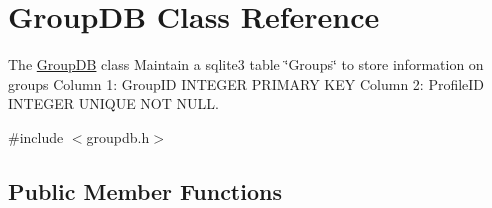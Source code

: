 \hypertarget{classGroupDB}{}\section{Group\+DB Class Reference}
\label{classGroupDB}


The \hyperlink{classGroupDB}{Group\+DB} class Maintain a sqlite3 table \char`\"{}\+Groups\char`\"{} to store information on groups Column 1\+: Group\+ID I\+N\+T\+E\+G\+ER P\+R\+I\+M\+A\+RY K\+EY Column 2\+: Profile\+ID I\+N\+T\+E\+G\+ER U\+N\+I\+Q\+UE N\+OT N\+U\+LL.  




{\ttfamily \#include $<$groupdb.\+h$>$}

\subsection*{Public Member Functions}
